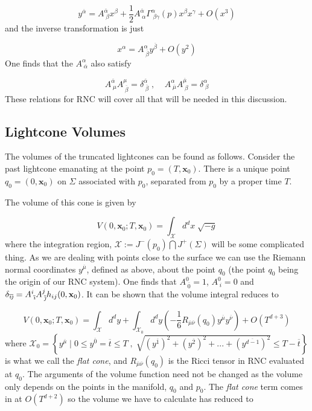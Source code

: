 \documentclass[12pt]{article}
\newcommand{\be}{\begin{equation}}
\newcommand{\ee}{\end{equation}}
\begin{document}
\be\label{eq:RNCtotaltrans}
y^{\overline{\alpha}}=A^{\overline{\alpha}}_{\;\beta}x^\beta+\frac{1}{2}A^{\overline{\alpha}}_{\;\alpha}\Gamma^{\alpha}_{\;\beta\gamma}(p)x^\beta x^\gamma+O(x^3)
\ee
and the inverse transformation is just

\be\label{eq:RNCinversetrans}
x^{\alpha}=A^{\alpha}_{\;\overline{\beta}}y^{\overline{\beta}}+O(y^2)
\ee
One finds that the $A^{\alpha}_{\;\overline{\alpha}}$ also satisfy

\be\label{eq:RNCeqnforA}
A^{\overline{\alpha}}_{\;\mu}A^{\mu}_{\;\overline{\beta}}=\delta^{\overline{\alpha}}_{\;\overline{\beta}}\;,\;\;\;\;A^{\alpha}_{\;\overline{\mu}}A^{\overline{\mu}}_{\;\beta}=\delta^{\alpha}_{\;\beta}
\ee
These relations for RNC will cover all that will be needed in this discussion.

\subsection{Lightcone Volumes}

The volumes of the truncated lightcones can be found as follows. Consider the past lightcone emanating at the point $p_0=(T,\mathbf x_0)$. There is a unique point $q_0=(0,\mathbf x_0)$ on $\Sigma$ associated with $p_0$, separated from $p_0$ by a proper time $T$. 

The volume of this cone is given by

\be\label{eq:VolumeWithNoSimplifications}
V(0,\mathbf{x}_0;T,\mathbf{x}_0)=\int_{\mathcal{X}} d^d x\;\sqrt{-g}
\ee
where the integration region, $\mathcal{X}:= J^-(p_0)\bigcap J^+(\Sigma)$ will be some complicated thing. As we are dealing with points close to the surface we can use the  Riemann normal coordinates $y^{\overline{\mu}}$, defined as above, about the point $q_0$ (the point $q_0$ being the origin of our RNC system). One finds that $A^0_{\;\overline{0}}=1$, $A^0_{\;i}=0$ and $\delta_{\overline{\emph\i}\overline{\emph\j}}=A^i_{\;\overline{\emph\i}}A^j_{\;\overline{\emph\j}}h_{ij}(0,\mathbf{x}_0)$. It can be shown that the volume integral reduces to \cite{Khetrapal_Sumati:Causal_Diamond_Volume}

\be\label{eq:VolumeWithRNC}
V(0,\mathbf{x}_0;T,\mathbf{x}_0) =\int_{\mathcal{X}}d^dy+\int_{\mathcal{X}_0}d^dy\left(-\frac{1}{6}R_{\overline{\mu}\overline{\nu}}(q_0)y^{\overline{\mu}}y^{\overline{\nu}} \right)+O(T^{d+3})
\ee
where $\mathcal{X}_0=\left\lbrace y^{\overline{\mu}} \mid 0\leq y^{\overline{0}}=\overline{t}\leq T\; ,\; \sqrt{(y^{\overline{1}})^2+(y^{\overline{2}})^2+...+(y^{\overline{d-1}})^2}\leq T-\overline{t} \right\rbrace$ is what we call the \textit{flat cone}, and $R_{\overline{\mu}\overline{\nu}}(q_0)$ is the Ricci tensor in RNC evaluated at $q_0$. The arguments of the volume function need not be changed as the volume only depends on the points in the manifold, $q_0$ and $p_0$. The \textit{flat cone} term comes in at $O(T^{d+2})$ so the volume we have to calculate has reduced to
\end{document}
